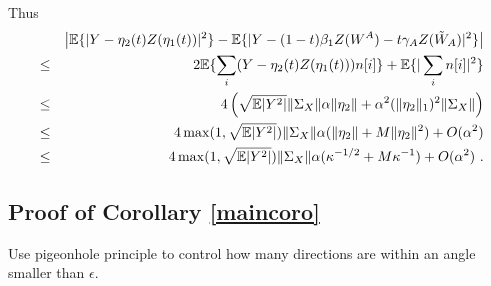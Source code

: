 Thus 
\begin{eqnarray*}
&& \left | {\mathbb{E}} \{ | Y - \eta_2(t) Z(\eta_1(t) ) |^2 \}  - {\mathbb{E}} \{ | Y - (1-t) \beta_1 Z(W^A) - t \gamma_A Z(\tilde{W}_A) |^2 \} \right| \\
 &\leq& 2{\mathbb{E}}\{  \sum_i (Y - \eta_2(t) Z(\eta_1(t) )) n[i]  \} + {\mathbb{E}} \{ | \sum_i n[i] |^2 \} \\
 &\leq & 4\left( \sqrt{{\mathbb{E}}|Y^2|} \| \Sigma_X\| \alpha \| \eta_2 \| + \alpha^2 (\| \eta_2 \|_1)^2  \| \Sigma_X \| \right) \\
 &\leq & 4 \max(1, \sqrt{{\mathbb{E}}|Y^2|}) \| \Sigma_X \| \alpha ( \| \eta_2 \| + M \| \eta_2 \|^2) + O(\alpha^2) \\
 & \leq & 4 \max(1, \sqrt{{\mathbb{E}}|Y^2|}) \| \Sigma_X \| \alpha ( \kappa^{-1/2} + M \kappa^{-1}) + O(\alpha^2)~.
\end{eqnarray*}
 




\subsection{Proof of Corollary \ref{maincoro}}


Use pigeonhole principle to control how many directions are within an angle smaller than $\epsilon$. 





